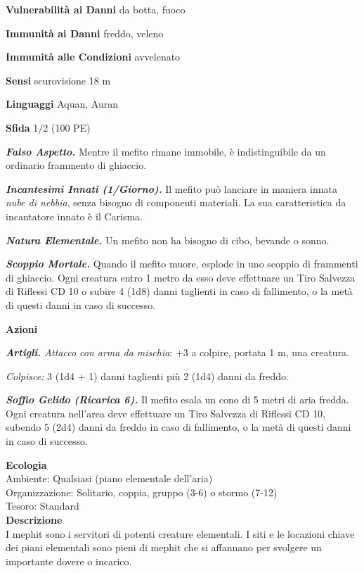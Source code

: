 \begin{multicols}{2}
\textbf{Vulnerabilità ai Danni} da botta, fuoco

\textbf{Immunità ai Danni} freddo, veleno

\textbf{Immunità alle Condizioni} avvelenato

\textbf{Sensi} scurovisione 18 m

\textbf{Linguaggi} Aquan, Auran

\textbf{Sfida} 1/2 (100 PE)

\emph{\textbf{Falso Aspetto.}} Mentre il mefito rimane immobile, è indistinguibile da un ordinario frammento di ghiaccio.

\emph{\textbf{Incantesimi Innati (1/Giorno).}} Il mefito può lanciare in maniera innata \emph{nube di nebbia}, senza bisogno di componenti materiali. La sua caratteristica da incantatore innato è il Carisma.

\emph{\textbf{Natura Elementale.}} Un mefito non ha bisogno di cibo, bevande o sonno.

\emph{\textbf{Scoppio Mortale.}} Quando il mefito muore, esplode in uno scoppio di frammenti di ghiaccio. Ogni creatura entro 1 metro da esso deve effettuare un Tiro Salvezza di Riflessi CD 10 o subire 4 (1d8) danni taglienti in caso di fallimento, o la metà di questi danni in caso
di successo.

\textbf{Azioni}

\emph{\textbf{Artigli.} Attacco con arma da mischia}: +3 a colpire,
portata 1 m, una creatura.

\emph{Colpisce:} 3 (1d4 + 1) danni taglienti più 2 (1d4) danni da
freddo.

\emph{\textbf{Soffio Gelido (Ricarica 6).}} Il mefito esala un cono di 5 metri di aria fredda. Ogni creatura nell'area deve effettuare un Tiro Salvezza di Riflessi CD 10, subendo 5 (2d4) danni da freddo in caso di fallimento, o la metà di questi danni in caso di successo.

\textbf{Ecologia}\\
Ambiente: Qualsiasi (piano elementale dell'aria)\\
Organizzazione: Solitario, coppia, gruppo (3-6) o stormo (7-12)\\
Tesoro: Standard\\
\textbf{Descrizione}\\
I mephit sono i servitori di potenti creature elementali. I siti e le locazioni chiave dei piani elementali sono pieni di mephit che si affannano per svolgere un importante dovere o incarico.\\


\end{multicols}
